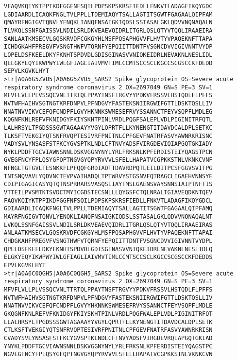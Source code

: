 \begin{lstlisting}
VFAQVKQIYKTPPIKDFGGFNFSQILPDPSKPSKRSFIEDLLFNKVTLADAGFIKQYGDC
LGDIAARDLICAQKFNGLTVLPPLLTDEMIAQYTSALLAGTITSGWTFGAGAALQIPFAM
QMAYRFNGIGVTQNVLYENQKLIANQFNSAIGKIQDSLSSTASALGKLQDVVNQNAQALN
TLVKQLSSNFGAISSVLNDILSRLDKVEAEVQIDRLITGRLQSLQTYVTQQLIRAAEIRA
SANLAATKMSECVLGQSKRVDFCGKGYHLMSFPQSAPHGVVFLHVTYVPAQEKNFTTAPA
ICHDGKAHFPREGVFVSNGTHWFVTQRNFYEPQIITTDNTFVSGNCDVVIGIVNNTVYDP
LQPELDSFKEELDKYFKNHTSPDVDLGDISGINASVVNIQKEIDRLNEVAKNLNESLIDL
QELGKYEQYIKWPWYIWLGFIAGLIAIVMVTIMLCCMTSCCSCLKGCCSCGSCCKFDEDD
SEPVLKGVKLHYT
>tr|A0A6G5ZVU5|A0A6G5ZVU5_SARS2 Spike glycoprotein OS=Severe acute respiratory syndrome coronavirus 2 OX=2697049 GN=S PE=3 SV=1
MFVFLVLLPLVSSQCVNLTTRTQLPPAYTNSFTRGVYYPDKVFRSSVLHSTQDLFLPFFS
NVTWFHAIHVSGTNGTKRFDNPVLPFNDGVYFASTEKSNIIRGWIFGTTLDSKTQSLLIV
NNATNVVIKVCEFQFCNDPFLGVYHKNNKSWMESEFRVYSSANNCTFEYVSQPFLMDLEG
KQGNFKNLREFVFKNIDGYFKIYSKHTPINLVRDLPQGFSALEPLVDLPIGINITRFQTL
LALHRSYLTPGDSSSGWTAGAAAYYVGYLQPRTFLLKYNENGTITDAVDCALDPLSETKC
TLKSFTVEKGIYQTSNFRVQPTESIVRFPNITNLCPFGEVFNATRFASVYAWNRKRISNC
VADYSVLYNSASFSTFKCYGVSPTKLNDLCFTNVYADSFVIRGDEVIQIAPGQTGKIADY
NYKLPDDFTGCVIAWNSNNLDSKVGGNYNYLYRLFRKSNLKPFERDISTEIYQAGSTPCN
GVEGFNCYFPLQSYGFQPTNGVGYQPYRVVVLSFELLHAPATVCGPKKSTNLVKNKCVNF
NFNGLTGTGVLTESNKKFLPFQQFGRDIADTTDAVRDPQTLEILDITPCSFGGVSVITPG
TNTSNQVAVLYQDVNCTEVPVAIHADQLTPTWRVYSTGSNVFQTRAGCLIGAEHVNNSYE
CDIPIGAGICASYQTQTNSPRRARSVASQSIIAYTMSLGAENSVAYSNNSIAIPTNFTIS
VTTEILPVSMTKTSVDCTMYICGDSTECSNLLLQYGSFCTQLNRALTGIAVEQDKNTQEV
FAQVKQIYKTPPIKDFGGFNFSQILPDPSKPSKRSFIEDLLFNKVTLADAGFIKQYGDCL
GDIAARDLICAQKFNGLTVLPPLLTDEMIAQYTSALLAGTITSGWTFGAGAALQIPFAMQ
MAYRFNGIGVTQNVLYENQKLIANQFNSAIGKIQDSLSSTASALGKLQDVVNQNAQALNT
LVKQLSSNFGAISSVLNDILSRLDKVEAEVQIDRLITGRLQSLQTYVTQQLIRAAEIRAS
ANLAATKMSECVLGQSKRVDFCGKGYHLMSFPQSAPHGVVFLHVTYVPAQEKNFTTAPAI
CHDGKAHFPREGVFVSNGTHWFVTQRNFYEPQIITTDNTFVSGNCDVVIGIVNNTVYDPL
QPELDSFKEELDKYFKNHTSPDVDLGDISGINASVVNIQKEIDRLNEVAKNLNESLIDLQ
ELGKYEQYIKWPWYIWLGFIAGLIAIVMVTIMLCCMTSCCSCLKGCCSCGSCCKFDEDDS
EPVLKGVKLHYT
>tr|A0A6C0QGH5|A0A6C0QGH5_SARS2 Spike glycoprotein OS=Severe acute respiratory syndrome coronavirus 2 OX=2697049 GN=S PE=3 SV=1
MFVFLVLLPLVSSQCVNLTTRTQLPPAYTNSFTRGVYYPDKVFRSSVLHSTQDLFLPFFS
NVTWFHAIHVSGTNGTKRFDNPVLPFNDGVYFASTEKSNIIRGWIFGTTLDSKTQSLLIV
NNATNVVIKVCEFQFCNDPFLGVYYHKNNKSWMESEFRVYSSANNCTFEYVSQPFLMDLE
GKQGNFKNLREFVFKNIDGYFKIYSKHTPINLVRDLPQGFWALEPLVDLPIGINITRFQT
LLALHRSYLTPGDSSSGWTAGAAAYYVGYLQPRTFLLKYNENGTITDAVDCALDPLSETK
CTLKSFTVEKGIYQTSNFRVQPTESIVRFPNITNLCPFGEVFNATRFASVYAWNRKRISN
CVADYSVLYNSASFSTFKCYGVSPTKLNDLCFTNVYADSFVIRGDEVRQIAPGQTGKIAD
YNYKLPDDFTGCVIAWNSNNLDSKVGGNYNYLYRLFRKSNLKPFERDISTEIYQAGSTPC
NGVEGFNCYFPLQSYGFQPTNGVGYQPYRVVVLSFELLHAPATVCGPKKSTNLVKNKCVN

\end{lstlisting}

